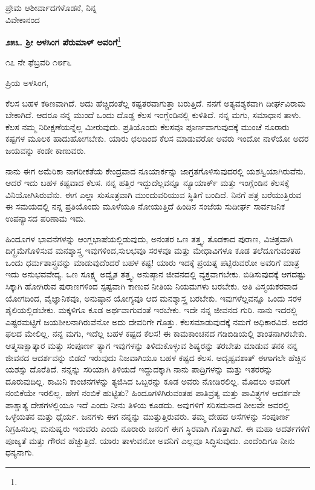 \vspace{-0.35cm}

{\flushright
ಪ್ರೇಮ ಆಶೀರ್ವಾದಗಳೊಡನೆ, ನಿನ್ನ\\ವಿವೇಕಾನಂದ\par}

\begin{center}
\textbf{೨೫೩. ಶ‍್ರೀ ಅಳಸಿಂಗ ಪೆರುಮಾಳ್ ಅವರಿಗೆ}\footnote{}
\end{center}

\vspace{-0.7cm}

\begin{flushright}
೧೭ ನೇ ಫೆಬ್ರವರಿ ೧೮೯೬
\end{flushright}

\vspace{-0.35cm}

\noindent
ಪ್ರಿಯ ಅಳಸಿಂಗ,

ಕೆಲಸ ಬಹಳ ಕಠಿಣವಾಗಿದೆ. ಅದು ಹೆಚ್ಚಿದಂತೆಲ್ಲ ಕಷ್ಟತರವಾಗುತ್ತಾ ಬರುತ್ತಿದೆ. ನನಗೆ ಅತ್ಯವಶ್ಯಕವಾಗಿ ದೀರ್ಘವಿರಾಮ ಬೇಕಾಗಿದೆ. ಆದರೂ ನನ್ನ ಮುಂದೆ ಒಂದು ದೊಡ್ಡ ಕೆಲಸ ಇಂಗ್ಲೆಂಡಿನಲ್ಲಿ ಕುಳಿತಿದೆ. ನನ್ನ ಮಗು, ಸಮಾಧಾನ ತಾಳು. ಕೆಲಸ ನಮ್ಮ ನಿರೀಕ್ಷಣೆಯನ್ನೆಲ್ಲ ಮೀರುವುದು. ಪ್ರತಿಯೊಂದು ಕೆಲಸವೂ ಪೂರ್ಣವಾಗುವುದಕ್ಕೆ ಮುಂಚೆ ನೂರಾರು ಕಷ್ಟಗಳ ಮೂಲಕ ಹಾದುಹೋಗಬೇಕು. ಯಾರು ಛಲದಿಂದ ಕೆಲಸ ಮಾಡುವರೋ ಅವರು ಇಂದೋ ನಾಳೆಯೋ ಅದರ ಜಯವನ್ನು ಕಂಡೇ ಕಾಣುವರು.

ನಾನು ಈಗ ಅಮೆರಿಕಾ ನಾಗರೀಕತೆಯ ಕೇಂದ್ರವಾದ ನೂಯಾರ್ಕನ್ನು ಜಾಗ್ರತಗೊಳಿಸುವುದರಲ್ಲಿ ಯಶಸ್ವಿಯಾಗಿರುವೆನು. ಆದರೆ ಇದು ಬಹಳ ಕಷ್ಟವಾದ ಕೆಲಸ. ನನ್ನ ಹತ್ತಿರ ಇದ್ದುದೆಲ್ಲವನ್ನೂ ನ್ಯೂಯಾರ್ಕ್ ಮತ್ತು ಇಂಗ್ಲೆಂಡಿನ ಕೆಲಸಕ್ಕೆ ವಿನಿಯೋಗಿಸಿರುವೆನು. ಈಗ ಎಲ್ಲಾ ಸುಸೂತ್ರವಾಗಿ ಮುಂದುವರಿಯುವ ಸ್ಥಿತಿಗೆ ಬಂದಿದೆ. ನಿನಗೆ ಪತ್ರ ಬರೆಯುತ್ತಿರುವ ಈ ಸಮಯದಲ್ಲಿ ನನ್ನ ಪ್ರತಿಯೊಂದು ಮೂಳೆಯೂ ನೋಯುತ್ತಿದೆ\enginline{-} ಹಿಂದಿನ ಸಂಜೆಯ ಸುದೀರ್ಘ ಸಾರ್ವಜನಿಕ ಉಪನ್ಯಾಸದ ಪರಿಣಾಮ ಇದು.

ಹಿಂದೂಗಳ ಭಾವನೆಗಳನ್ನು ಆಂಗ್ಲಭಾಷೆಯಲ್ಲಿಡುವುದು, ಅನಂತರ ಒಣ ತತ್ತ್ವ, ತೊಡಕಾದ ಪುರಾಣ, ವಿಚಿತ್ರವಾಗಿ ದಿಗ್ಭ್ರಮೆಗೊಳಿಸುವ ಮನಶ್ಶಾಸ್ತ್ರ ಇವುಗಳಿಂದ,\break ಸುಲಭವೂ ಸರಳವೂ ಮತ್ತು ಮೇಧಾವಿಗಳೂ ಕೂಡ ತಲೆದೂಗುವಂತಹ ಒಂದು ಧರ್ಮಶಾಸ್ತ್ರವನ್ನು ಮಾಡುವುದೆಂದರೆ ಬಹಳ ಕಷ್ಟ! ಯಾರು ಇದಕ್ಕೆ ಪ್ರಯತ್ನ ಪಟ್ಟಿರುವರೋ ಅವರಿಗೆ ಮಾತ್ರ ಇದು ಅನುಭವವೇದ್ಯ. ಒಣ ಸೂಕ್ಷ್ಮ ಅದ್ವೈತ ತತ್ತ್ವ, ಅನುಷ್ಠಾನ ಜೀವನದಲ್ಲಿ ವ್ಯಕ್ತವಾಗಬೇಕು. ಬಿಡಿಸುವುದಕ್ಕೆ ಆಗದಷ್ಟು ಸಿಕ್ಕಾಗಿ ಹೋಗಿರುವ ಪುರಾಣಗಳಿಂದ ಸ್ಪಷ್ಟವಾಗಿ ಕಾಣುವ ನೀತಿಯ ನಿಯಮಗಳು ಬರಬೇಕು. ಅತಿ ವಿಸ್ಮಯಕರವಾದ ಯೋಗದಿಂದ, ವೈಜ್ಞಾನಿಕವೂ, ಅನುಷ್ಠಾನ ಯೋಗ್ಯವೂ ಆದ ಮನಶ್ಶಾಸ್ತ್ರ ಬರಬೇಕು. ಇವುಗಳೆಲ್ಲವನ್ನೂ ಒಂದು ಸರಳ ಶೈಲಿಯಲ್ಲಿಡಬೇಕು. ಮಕ್ಕಳಿಗೂ ಕೂಡ ಅರ್ಥವಾಗುವಂತೆ ಇರಬೇಕು. ಇದೇ ನನ್ನ ಜೀವನದ ಗುರಿ. ನಾನು ಇದರಲ್ಲಿ ಎಷ್ಟರಮಟ್ಟಿಗೆ ಜಯಶೀಲನಾಗಿರುವೆನೋ ಅದು ದೇವರಿಗೇ ಗೊತ್ತು. ಕೆಲಸಮಾಡುವುದಕ್ಕೆ ನಮಗೆ ಅಧಿಕಾರವಿದೆ. ಅದರ ಫಲದ ಮೇಲಿಲ್ಲ. ನನ್ನ ಮಗು, ಇದೆಲ್ಲ ಬಹಳ ಕಷ್ಟದ ಕೆಲಸ! ಈ ಕಾಮಕಾಂಚನದ ಗಡಿಬಿಡಿಯಲ್ಲಿ ಶಾಂತನಾಗಿರಬೇಕು. ಆತ್ಮಸಾಕ್ಷಾತ್ಕಾರ ಮತ್ತು ಸಂಪೂರ್ಣ ತ್ಯಾಗ ಇವುಗಳನ್ನು ತಿಳಿದುಕೊಳ್ಳುವ ಶಿಷ್ಯರನ್ನು ತರಬೇತು ಮಾಡುವ ತನಕ ನನ್ನ ಜೀವನದ ಆದರ್ಶವನ್ನು ಬಿಡದೆ ಇರುವುದು ನಿಜವಾಗಿಯೂ ಬಹಳ ಕಷ್ಟದ ಕೆಲಸ. ಅದೃಷ್ಟವಶಾತ್ ಈಗಾಗಲೇ ಹೆಚ್ಚಿನ ಯಶಸ್ಸು ದೊರೆತಿದೆ. ನನ್ನನ್ನು ಸರಿಯಾಗಿ ತಿಳಿಯದೆ ಇದ್ದುದಕ್ಕಾಗಿ ನಾನು ಪಾದ್ರಿಗಳನ್ನು ಮತ್ತು ಇತರರನ್ನು ದೂರುವುದಿಲ್ಲ. ಕಾಮಿನಿ ಕಾಂಚನಗಳನ್ನು ತ್ಯಜಿಸಿದ ಒಬ್ಬರನ್ನು ಕೂಡ ಅವರು ನೋಡಿರಲಿಲ್ಲ. ಮೊದಲು ಅವರಿಗೆ ನಂಬಿಕೆಯೇ ಇರಲಿಲ್ಲ. ಹೇಗೆ ನಂಬಿಕೆ ಹುಟ್ಟಿತು? ಹಿಂದೂಗಳಿಗಿರುವಂತಹ ಪಾತಿವ್ರತ್ಯ ಮತ್ತು ಪಾವಿತ್ರ್ಯಗಳ ಆದರ್ಶವೇ ಪಾಶ್ಚಾತ್ಯ ದೇಶಗಳಲ್ಲಿಯೂ ಇದೆ ಎಂದು ನೀನು ತಿಳಿಯ ಕೂಡದು. ಅವುಗಳಿಗೆ ಸರಿಸಮನಾದ ಶೀಲವೇ ಅವರಲ್ಲಿ ಒಳ್ಳೆಯತನ ಮತ್ತು ಧೈರ್ಯ. ಜನಗಳು ಈಗ ನನ್ನನ್ನು ಮುತ್ತುತ್ತಿರುವರು. ತಮ್ಮ ದೇಹದ ಆಸೆಗಳನ್ನು ಸಂಪೂರ್ಣ ನಿಗ್ರಹಿಸಬಲ್ಲ ಮನುಷ್ಯರು ಇರುವರು ಎಂದು ನೂರಾರು ಜನರಿಗೆ ಈಗ ಸ್ಥಿರವಾಗಿ ಗೊತ್ತಾಗಿದೆ. ಈ ಮಹಾ ಆದರ್ಶಗಳಿಗೆ ಪೂಜ್ಯತೆ ಮತ್ತು ಗೌರವ ಹೆಚ್ಚುತ್ತಿದೆ. ಯಾರು ತಾಳುವನೋ ಅವನಿಗೆ ಎಲ್ಲವೂ ಸಿದ್ಧಿಸುವುದು. ಎಂದೆಂದಿಗೂ ನೀನು ಧನ್ಯನಾಗು.

